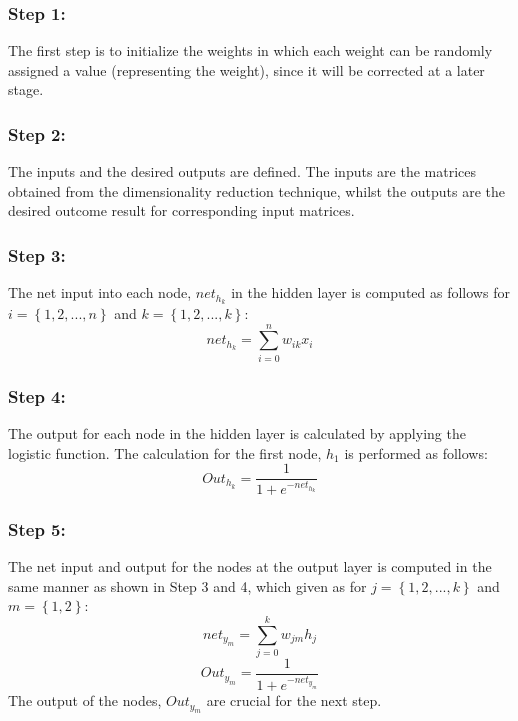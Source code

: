 \documentclass[11pt,twocolumn]{witseiepaper}
\begin{document}
	\subsubsection{Step 1:} 
	The first step is to initialize the weights in which each weight can be randomly assigned a value (representing the weight), since it will be corrected at a later stage.
	
	\subsubsection{Step 2:}
	The inputs and the desired outputs are defined. The inputs are the matrices obtained from the dimensionality reduction technique, whilst the outputs are the desired outcome result for corresponding input matrices.
	
	\subsubsection{Step 3:}
	The net input into each node, $net_{h_k}$ in the hidden layer is computed as follows for $i = \left\{1, 2, ..., n\right\}$ and $k = \left\{1, 2, ..., k\right\}$:
	\begin{equation}
		net_{h_k} = \sum_{i = 0}^{n} w_{ik}x_i 
	\end{equation}
	
	\subsubsection{Step 4:}
	The output for each node in the hidden layer is calculated by applying the logistic function. The calculation for the first node, $h_1$ is performed as follows:
	\begin{equation}
		Out_{h_k} = \frac{1}{1 + e^{-net_{h_k}}}
	\end{equation}
	
	\subsubsection{Step 5:}
	The net input and output for the nodes at the output layer is computed in the same manner as shown in Step 3 and 4, which given as for $j = \left\{1, 2, ..., k\right\}$ and $m = \left\{1, 2\right\}$:
	\begin{equation}
		net_{y_m} = \sum_{j = 0}^{k} w_{jm}h_j
	\end{equation}
	\begin{equation}
		Out_{y_m} = \frac{1}{1 + e^{-net_{y_m}}}
	\end{equation}
	The output of the nodes, $Out_{y_m}$ are crucial for the next step. 
	
\end{document}

